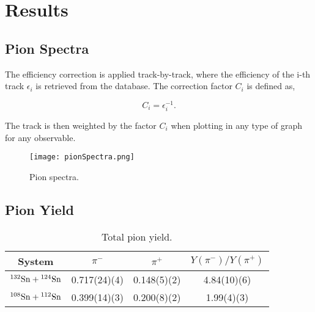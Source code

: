 \chapter{Results}
\cite{jon}
 
\section{Pion Spectra}

The efficiency correction is applied track-by-track, where the efficiency of the i-th track $\epsilon_i$ is retrieved from the database. The correction factor $C_i$ is defined as,

\begin{equation}
C_i = \epsilon_i^{-1}.
\end{equation}

The track is then weighted by the factor $C_i$ when plotting in any type of graph for any observable. 






\begin{figure}[!htb]
\centering
\texttt{[image: pionSpectra.png]}
\caption{Pion spectra. }
\label{fig:pionspectra}
\end{figure}



\section{Pion Yield}


\begin{table*}\centering
{}
\begin{tabular}{@{}cccc@{}}\toprule
System & $\pi^-$ & $\pi^+$ & $Y(\pi^-)/Y(\pi^+)$  \\
\midrule
${}^{132}\mathrm{Sn} + {}^{124}\mathrm{Sn}$ & 0.717(24)(4) & 0.148(5)(2) & 4.84(10)(6)  \\
${}^{108}\mathrm{Sn} + {}^{112}\mathrm{Sn}$ & 0.399(14)(3) & 0.200(8)(2) & 1.99(4)(3)  \\
\bottomrule
\end{tabular}
\caption{Total pion yield.}
\label{tb:pionyield}
\end{table*}







